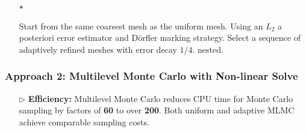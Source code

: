\documentclass{beamer}
\begin{document}
\begin{frame}[t]
\begin{itemize}[leftmargin=5pt]
\begin{itemize}[leftmargin=7pt]
{\begin{itemize}[leftmargin=15pt]
            \item[$\star$] {\fontsize{9}{9}\selectfont Start from the same coarsest mesh as the uniform mesh. Using an $L_2$ a posteriori error estimator and D\"{o}rfler marking strategy. Select a sequence of adaptively refined meshes with error decay $1/4$. \textcolor{myred}{nested}.\par}
        
        \end{itemize}
        \par}
\end{itemize}
\end{itemize}
\end{frame}




\begin{frame}[t]
    \frametitle{Approach 2: Multilevel Monte Carlo with Non-linear Solve}
\begin{itemize}[leftmargin=5pt] 
\item[$\triangleright$] \textcolor{myblue3}{\bf Efficiency:} {\footnotesize Multilevel Monte Carlo reduces CPU time for Monte Carlo sampling by factors of {\bf 60} to over {\bf 200}. Both uniform and adaptive MLMC achieve comparable sampling costs.}
\vspace{2mm}
\begin{figure}[ht!]\centering
{}
\label{fig:Experiment_result_plot}
\end{figure}

\end{itemize}
\end{frame}
\end{document}

